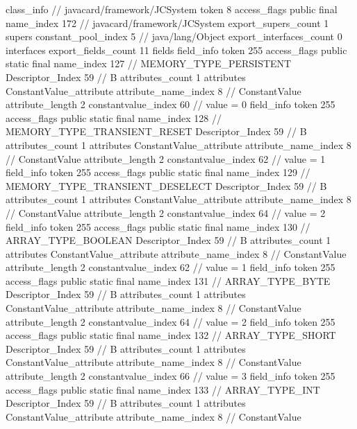{{{		}
		class_info {		// javacard/framework/JCSystem
			token	8
			access_flags	public final
			name_index	172		// javacard/framework/JCSystem
			export_supers_count	1
			supers {
				constant_pool_index	5		// java/lang/Object
			}
			export_interfaces_count	0
			interfaces {
			}
			export_fields_count	11
			fields {
			field_info {
				token	255
				access_flags	public static final
				name_index	127		// MEMORY_TYPE_PERSISTENT
				Descriptor_Index	59		// B
				attributes_count	1
				attributes {
				ConstantValue_attribute {
					attribute_name_index	8		// ConstantValue
					attribute_length	2
					constantvalue_index	60		// value = 0
				}
				}
			}
			field_info {
				token	255
				access_flags	public static final
				name_index	128		// MEMORY_TYPE_TRANSIENT_RESET
				Descriptor_Index	59		// B
				attributes_count	1
				attributes {
				ConstantValue_attribute {
					attribute_name_index	8		// ConstantValue
					attribute_length	2
					constantvalue_index	62		// value = 1
				}
				}
			}
			field_info {
				token	255
				access_flags	public static final
				name_index	129		// MEMORY_TYPE_TRANSIENT_DESELECT
				Descriptor_Index	59		// B
				attributes_count	1
				attributes {
				ConstantValue_attribute {
					attribute_name_index	8		// ConstantValue
					attribute_length	2
					constantvalue_index	64		// value = 2
				}
				}
			}
			field_info {
				token	255
				access_flags	public static final
				name_index	130		// ARRAY_TYPE_BOOLEAN
				Descriptor_Index	59		// B
				attributes_count	1
				attributes {
				ConstantValue_attribute {
					attribute_name_index	8		// ConstantValue
					attribute_length	2
					constantvalue_index	62		// value = 1
				}
				}
			}
			field_info {
				token	255
				access_flags	public static final
				name_index	131		// ARRAY_TYPE_BYTE
				Descriptor_Index	59		// B
				attributes_count	1
				attributes {
				ConstantValue_attribute {
					attribute_name_index	8		// ConstantValue
					attribute_length	2
					constantvalue_index	64		// value = 2
				}
				}
			}
			field_info {
				token	255
				access_flags	public static final
				name_index	132		// ARRAY_TYPE_SHORT
				Descriptor_Index	59		// B
				attributes_count	1
				attributes {
				ConstantValue_attribute {
					attribute_name_index	8		// ConstantValue
					attribute_length	2
					constantvalue_index	66		// value = 3
				}
				}
			}
			field_info {
				token	255
				access_flags	public static final
				name_index	133		// ARRAY_TYPE_INT
				Descriptor_Index	59		// B
				attributes_count	1
				attributes {
				ConstantValue_attribute {
					attribute_name_index	8		// ConstantValue
}}}}}}}
